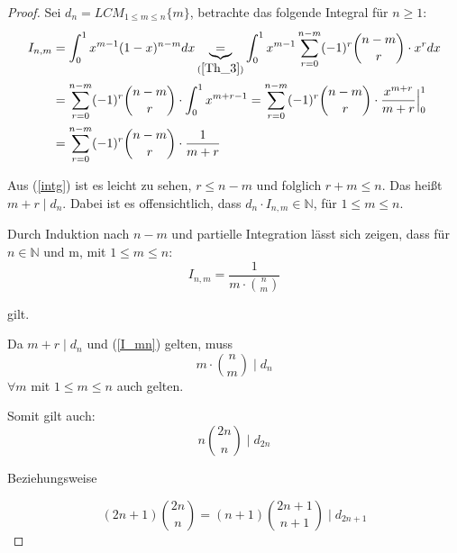 \documentclass[12pt,oneside]{article}
\theoremstyle{remark}
\theoremstyle{definition}
\begin{document}
\begin{proof}
Sei $d_{n} = LCM_{1 \leq m \leq n}{\{m\}}$, betrachte das folgende Integral für $n \geq 1$:\newline
\begin{equation}\label{intg}
    \begin{split}
      \begin{aligned}
        I_{n,m}&= \int_{0}^{1} x^{m-1} (1-x)^{n - m} dx \underbrace{=}_{(\ref{Th_3})} \int_{0}^{1} x^{m-1} \sum_{r = 0}^{n - m} (-1)^r {n - m\choose r} \cdot x^r dx \\
        &= \sum_{r = 0}^{n - m}(-1)^r {n - m \choose r} \cdot \int_{0}^{1} x^{m + r - 1} 
        = \sum_{r = 0}^{n - m} (-1)^r {n - m \choose r} \cdot \frac{x^{m+r}}{m+r}\Big|_0^1\\
        &= \sum_{r = 0}^{n - m} (-1)^r {n - m \choose r} \cdot \frac{1}{m + r}
      \end{aligned}
    \end{split}
\end{equation}

Aus (\ref{intg}) ist es leicht zu sehen, $r \leq n - m $ und folglich $ r + m \leq n $. Das heißt $m + r \mid d_{n}$. Dabei ist es offensichtlich, dass $d_{n} \cdot I_{n,m} \in \mathbb{N}$, für $1 \leq m \leq n$.

Durch Induktion nach $n - m$ und partielle Integration lässt sich zeigen, dass für $n \in \mathbb{N}$ und m, mit $1 \leq m \leq n$:
\begin{equation}\label{I_mn}
    I_{n,m} = \frac{1}{m \cdot {n \choose m}}
\end{equation}

gilt.\newline\newline


Da $m + r \mid d_{n} $ und (\ref{I_mn}) gelten, muss
\begin{equation}
    m \cdot {n \choose m} \mid d_{n}
\end{equation}
$\forall m $ mit $1 \leq m \leq n $ auch gelten.\newline

Somit gilt auch: 
\begin{equation}\label{d2n}
    n {2n\choose n} \mid d_{2n}
\end{equation}

Beziehungsweise 

\begin{equation}\label{d2n1}
    (2n + 1) {2n \choose n} = (n + 1) {2n + 1 \choose n + 1} \mid d_{2n + 1} 
\end{equation}


\end{proof}
\end{document}
